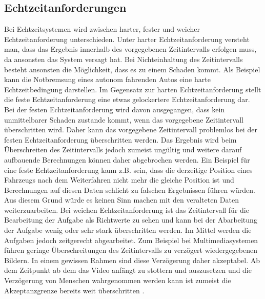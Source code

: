 \subsection{Echtzeitanforderungen}
Bei Echtzeitsystemen wird zwischen harter, fester und weicher Echtzeitanforderung unterschieden. Unter harter Echtzeitanforderung versteht man, dass das Ergebnis innerhalb des vorgegebenen Zeitintervalls  erfolgen muss, da ansonsten das System versagt hat. Bei Nichteinhaltung des Zeitintervalls besteht ansonsten die Möglichkeit, dass es zu einem Schaden kommt. Als Beispiel kann die Notbremsung eines autonom fahrenden Autos eine harte Echtzeitbedingung darstellen. Im Gegensatz zur harten Echtzeitanforderung stellt die feste Echtzeitanforderung eine etwas gelockertere Echtzeitanforderung dar. Bei der festen Echtzeitanforderung wird davon ausgegangen, dass kein unmittelbarer Schaden zustande kommt, wenn das vorgegebene Zeitintervall überschritten wird. Daher kann das vorgegebene Zeitintervall problemlos bei der festen Echtzeitanforderung überschritten werden. Das Ergebnis wird beim Überschreiten des Zeitintervalls jedoch zumeist ungültig und weitere darauf aufbauende Berechnungen können daher abgebrochen werden. Ein Beispiel für eine feste Echtzeitanforderung kann z.B. sein, dass die derzeitige Position eines Fahrzeugs nach dem Weiterfahren nicht mehr die gleiche Position ist und Berechnungen auf diesen Daten schlicht zu falschen Ergebnissen führen würden. Aus diesem Grund würde es keinen Sinn machen mit den veralteten Daten weiterzuarbeiten. Bei weichen Echtzeitanforderung ist das Zeitintervall für die Bearbeitung der Aufgabe als Richtwerte zu sehen und kann bei der Abarbeitung der Aufgabe wenig oder sehr stark überschritten werden. Im Mittel werden die Aufgaben jedoch zeitgerecht abgearbeitet. Zum Beispiel bei Multimediasystemen führen geringe Überschreitungen des Zeitintervalls zu verzögert wiedergegebenen Bildern. In einem gewissen Rahmen sind diese Verzögerung daher akzeptabel. Ab dem Zeitpunkt ab dem das Video anfängt zu stottern und auszusetzen und die Verzögerung von Menschen wahrgenommen werden kann ist zumeist die Akzeptanzgrenze bereits weit überschritten \cite[321\psq]{worn_echtzeitsysteme_2006}.\\

